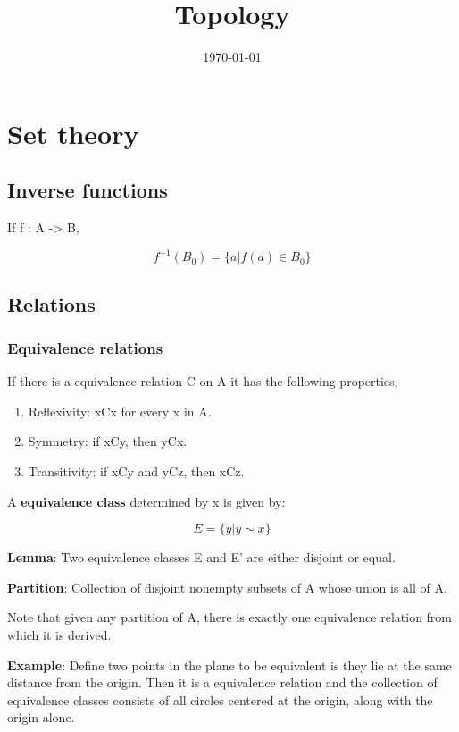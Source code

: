 \documentclass[11pt]{article}
\date{\today}
\title{Topology}
\begin{document}
\maketitle
\tableofcontents


\section{Set theory}
\label{sec:org9206ba0}

\subsection{Inverse functions}
\label{sec:org8ab5b89}

If f : A -> B,

\[
f^{-1}(B_0) = \{a \vert f(a) \in B_0\}
\]


\subsection{Relations}
\label{sec:org54efa40}

\subsubsection{Equivalence relations}
\label{sec:orgf7cd819}

If there is a equivalence relation C on A it has the following properties,

\begin{enumerate}
\item Reflexivity: xCx for every x in A.
\item Symmetry: if xCy, then yCx.
\item Transitivity: if xCy and yCz, then xCz.
\end{enumerate}

A \textbf{equivalence class} determined by x is given by:

\[
E = \{y \vert y \sim x\}
\]

\textbf{Lemma}: Two equivalence classes E and E' are either disjoint or equal.

\textbf{Partition}: Collection of disjoint nonempty subsets of A whose union is all of A.

Note that given any partition of A, there is exactly one equivalence relation from which it is derived.

\textbf{Example}: Define two points in the plane to be equivalent is they lie at the same distance from the origin. Then it is a equivalence relation and the collection of equivalence classes consists of all circles centered at the origin, along with the origin alone.
\end{document}

